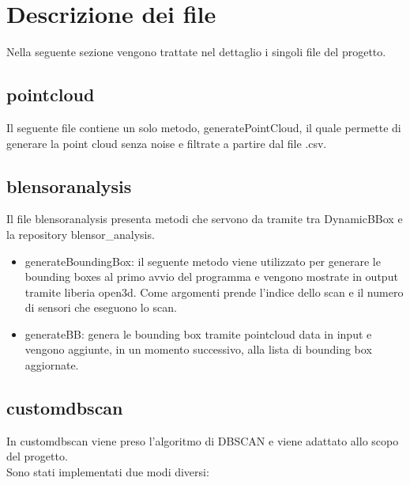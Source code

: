 \documentclass[italian]{article}
\begin{document}
\section{Descrizione dei file}
Nella seguente sezione vengono trattate nel dettaglio i singoli file del progetto.
\subsection{pointcloud}
Il seguente file contiene un solo metodo, generatePointCloud, il quale permette di generare la point cloud senza noise e filtrate a partire dal file .csv.\\
\subsection{blensoranalysis}
Il file blensoranalysis presenta metodi che servono da tramite tra DynamicBBox e la repository blensor\_analysis.
\begin{itemize}
		\item generateBoundingBox: il seguente metodo viene utilizzato per generare le bounding boxes al primo avvio del programma e vengono mostrate in output tramite liberia open3d. Come argomenti prende
			l'indice dello scan e il numero di sensori che eseguono lo scan. 
 		\item generateBB: genera le bounding box tramite pointcloud data in input e vengono aggiunte, in un momento successivo, alla lista di bounding box aggiornate.
\end{itemize}
\subsection{customdbscan}
In customdbscan viene preso l'algoritmo di DBSCAN e viene adattato allo scopo del progetto.\\
Sono stati implementati due modi diversi:
\end{document}
